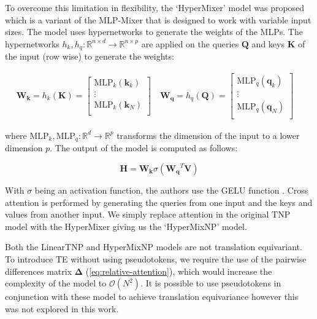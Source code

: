 \documentclass[../../main.tex]{subfiles}
\begin{document}
To overcome this limitation in flexibility, the `HyperMixer'  model \cite{mai2023hypermixer} was proposed which is a variant of the MLP-Mixer that is designed to work with variable input sizes. The model uses hypernetworks \cite{ha2016hypernetworks} to generate the weights of the MLPs. The hypernetworks $h_k, h_q : \mathbb{R}^{n \times d} \rightarrow \mathbb{R}^{n \times p}$ are applied on the queries $\bm{Q}$ and keys $\bm{K}$ of the input (row wise) to generate the weights:

\begin{align}
    \bm{W_k} = h_k(\bm{K}) =  \begin{bmatrix}
        \text{MLP}_k(\bm{k}_k) \\
        \vdots \\
        \text{MLP}_k(\bm{k}_N) \\
    \end{bmatrix} \quad
    \bm{W_q} = h_q(\bm{Q}) =  \begin{bmatrix}
        \text{MLP}_q(\bm{q}_k) \\
        \vdots \\
        \text{MLP}_q(\bm{q}_N) \\
    \end{bmatrix} \quad
\end{align}

where $\text{MLP}_k, \text{MLP}_q: \mathbb{R}^d \rightarrow \mathbb{R}^p$ transforms the dimension of the input to a lower dimension $p$. The output of the model is computed as follows:

\begin{equation}
    \bm{H} = \bm{W_k} \sigma(\bm{W_q}^T \bm{V})
\end{equation}

With $\sigma$ being an activation function, the authors use the GELU function \cite{hendrycks2023gaussian}.
Cross attention is performed by generating the queries from one input and the keys and values from another input. We simply replace attention in the original TNP model with the HyperMixer giving us the `HyperMixNP' model. 

\begin{note}
    Both the LinearTNP and HyperMixNP models are not translation equivariant. To introduce TE without using pseudotokens, we require the use of the pairwise differences matrix $\bm{\Delta}$ (\autoref{eq:relative-attention}), which would increase the complexity of the model to $\mathcal{O}(N^2)$. It is possible to use pseudotokens in conjunction with these model to achieve translation equivariance however this was not explored in this work.
\end{note}
\end{document}
